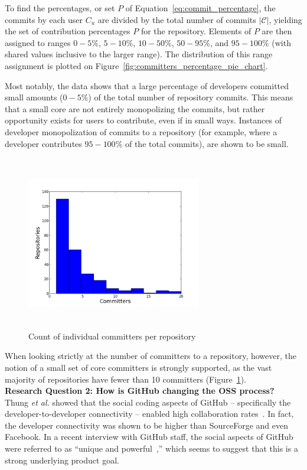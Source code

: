 \documentclass{proc}
\begin{document}
{{{{{To find the percentages, or set $P$ of Equation~\ref{eq:commit_percentage}, the commits by each user $C_u$ are divided by the total number of commits $|\mathscr{C}|$, yielding the set of contribution percentages $P$ for the repository. Elements of $P$ are then assigned to ranges $0-5\%$, $5-10\%$, $10-50\%$, $50-95\%$, and $95-100\%$ (with shared values inclusive to the larger range). The distribution of this range assignment is plotted on Figure~\ref{fig:committers_percentage_pie_chart}.

Most notably, the data shows that a large percentage of developers committed small amounts ($0-5\%$) of the total number of repository commits. This means that a small core are not entirely monopolizing the commits, but rather opportunity exists for users to contribute, even if in small ways. Instances of developer monopolization of commits to a repository (for example, where a developer contributes $95-100\%$ of the total commits), are shown to be small.

\begin{figure}
\includegraphics[height=3in,width=3in]{images/committers_histogram.png}
\caption{Count of individual committers per repository}
\label{fig:committers_histogram}
\end{figure}

When looking strictly at the number of committers to a repository, however, the notion of a small set of core committers is strongly supported, as the vast majority of repositories have fewer than 10 committers (Figure~\ref{fig:committers_histogram}).\\

\noindent \textbf{Research Question 2: How is GitHub changing the OSS process?}\\
Thung \textit{et al.} showed that the social coding aspects of GitHub -- specifically the developer-to-developer connectivity -- enabled high collaboration rates~\cite{thung2013network}. In fact, the developer connectivity was shown to be higher than SourceForge and even Facebook. In a recent interview with GitHub staff, the social aspects of GitHub were referred to as ``unique and powerful~\cite{begel2013social},'' which seems to suggest that this is a strong underlying product goal.

}}}}}
\end{document}
